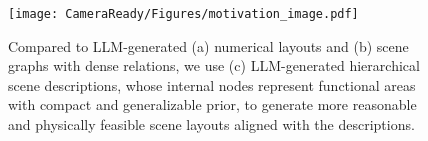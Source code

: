 \begin{figure}[t]
\centering
\texttt{[image: CameraReady/Figures/motivation\_image.pdf]}
\caption{Compared to LLM-generated (a) numerical layouts and (b) scene graphs with dense relations, we use (c) LLM-generated hierarchical scene descriptions, whose internal nodes represent functional areas with compact and generalizable prior, to generate more reasonable and physically feasible scene layouts aligned with the descriptions.}
\label{pipeline}
\end{figure}

% 
